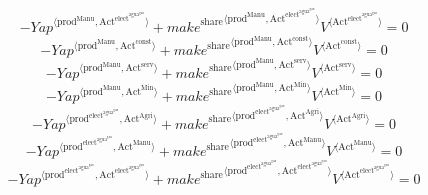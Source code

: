\begin{equation}
-{{Y\!a\!p}}^{\langle \mathrm{prod}^{\mathrm{Manu}},\mathrm{Act}^{\mathrm{elect}^{\mathrm{agua}^{\mathrm{gas}}}}\rangle} + {{{m\!a\!k\!e}^{\mathrm{share}}}^{\langle \mathrm{\mathrm{prod}^{\mathrm{Manu}}},\mathrm{\mathrm{Act}^{\mathrm{elect}^{\mathrm{agua}^{\mathrm{gas}}}}}\rangle}} {{V}^{\langle \mathrm{Act}^{\mathrm{elect}^{\mathrm{agua}^{\mathrm{gas}}}}\rangle}} = 0
\end{equation}
\begin{equation}
-{{Y\!a\!p}}^{\langle \mathrm{prod}^{\mathrm{Manu}},\mathrm{Act}^{\mathrm{const}}\rangle} + {{{m\!a\!k\!e}^{\mathrm{share}}}^{\langle \mathrm{\mathrm{prod}^{\mathrm{Manu}}},\mathrm{\mathrm{Act}^{\mathrm{const}}}\rangle}} {{V}^{\langle \mathrm{Act}^{\mathrm{const}}\rangle}} = 0
\end{equation}
\begin{equation}
-{{Y\!a\!p}}^{\langle \mathrm{prod}^{\mathrm{Manu}},\mathrm{Act}^{\mathrm{serv}}\rangle} + {{{m\!a\!k\!e}^{\mathrm{share}}}^{\langle \mathrm{\mathrm{prod}^{\mathrm{Manu}}},\mathrm{\mathrm{Act}^{\mathrm{serv}}}\rangle}} {{V}^{\langle \mathrm{Act}^{\mathrm{serv}}\rangle}} = 0
\end{equation}
\begin{equation}
-{{Y\!a\!p}}^{\langle \mathrm{prod}^{\mathrm{Manu}},\mathrm{Act}^{\mathrm{Min}}\rangle} + {{{m\!a\!k\!e}^{\mathrm{share}}}^{\langle \mathrm{\mathrm{prod}^{\mathrm{Manu}}},\mathrm{\mathrm{Act}^{\mathrm{Min}}}\rangle}} {{V}^{\langle \mathrm{Act}^{\mathrm{Min}}\rangle}} = 0
\end{equation}
\begin{equation}
-{{Y\!a\!p}}^{\langle \mathrm{prod}^{\mathrm{elect}^{\mathrm{agua}^{\mathrm{gas}}}},\mathrm{Act}^{\mathrm{Agri}}\rangle} + {{{m\!a\!k\!e}^{\mathrm{share}}}^{\langle \mathrm{\mathrm{prod}^{\mathrm{elect}^{\mathrm{agua}^{\mathrm{gas}}}}},\mathrm{\mathrm{Act}^{\mathrm{Agri}}}\rangle}} {{V}^{\langle \mathrm{Act}^{\mathrm{Agri}}\rangle}} = 0
\end{equation}
\begin{equation}
-{{Y\!a\!p}}^{\langle \mathrm{prod}^{\mathrm{elect}^{\mathrm{agua}^{\mathrm{gas}}}},\mathrm{Act}^{\mathrm{Manu}}\rangle} + {{{m\!a\!k\!e}^{\mathrm{share}}}^{\langle \mathrm{\mathrm{prod}^{\mathrm{elect}^{\mathrm{agua}^{\mathrm{gas}}}}},\mathrm{\mathrm{Act}^{\mathrm{Manu}}}\rangle}} {{V}^{\langle \mathrm{Act}^{\mathrm{Manu}}\rangle}} = 0
\end{equation}
\begin{equation}
-{{Y\!a\!p}}^{\langle \mathrm{prod}^{\mathrm{elect}^{\mathrm{agua}^{\mathrm{gas}}}},\mathrm{Act}^{\mathrm{elect}^{\mathrm{agua}^{\mathrm{gas}}}}\rangle} + {{{m\!a\!k\!e}^{\mathrm{share}}}^{\langle \mathrm{\mathrm{prod}^{\mathrm{elect}^{\mathrm{agua}^{\mathrm{gas}}}}},\mathrm{\mathrm{Act}^{\mathrm{elect}^{\mathrm{agua}^{\mathrm{gas}}}}}\rangle}} {{V}^{\langle \mathrm{Act}^{\mathrm{elect}^{\mathrm{agua}^{\mathrm{gas}}}}\rangle}} = 0
\end{equation}
